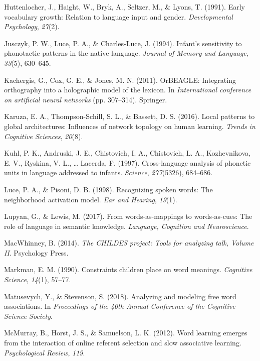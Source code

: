 \documentclass[english,floatsintext,man]{apa6}
\theoremstyle{definition}
\theoremstyle{definition}
\theoremstyle{definition}
\theoremstyle{remark}
\begin{document}
\hypertarget{ref-huttenlocher1991}{}
Huttenlocher, J., Haight, W., Bryk, A., Seltzer, M., \& Lyons, T.
(1991). Early vocabulary growth: Relation to language input and gender.
\emph{Developmental Psychology}, \emph{27}(2).

\hypertarget{ref-jusczyk1994}{}
Jusczyk, P. W., Luce, P. A., \& Charles-Luce, J. (1994). Infant's
sensitivity to phonotactic patterns in the native language.
\emph{Journal of Memory and Language}, \emph{33}(5), 630--645.

\hypertarget{ref-kachergis2011}{}
Kachergis, G., Cox, G. E., \& Jones, M. N. (2011). OrBEAGLE: Integrating
orthography into a holographic model of the lexicon. In
\emph{International conference on artificial neural networks} (pp.
307--314). Springer.

\hypertarget{ref-karuza2016}{}
Karuza, E. A., Thompson-Schill, S. L., \& Bassett, D. S. (2016). Local
patterns to global architectures: Influences of network topology on
human learning. \emph{Trends in Cognitive Sciences}, \emph{20}(8).

\hypertarget{ref-kuhl1997}{}
Kuhl, P. K., Andruski, J. E., Chistovich, I. A., Chistovich, L. A.,
Kozhevnikova, E. V., Ryskina, V. L., \ldots{} Lacerda, F. (1997).
Cross-language analysis of phonetic units in language addressed to
infants. \emph{Science}, \emph{277}(5326), 684--686.

\hypertarget{ref-luce1998}{}
Luce, P. A., \& Pisoni, D. B. (1998). Recognizing spoken words: The
neighborhood activation model. \emph{Ear and Hearing}, \emph{19}(1).

\hypertarget{ref-lupyan2017}{}
Lupyan, G., \& Lewis, M. (2017). From words-as-mappings to
words-as-cues: The role of language in semantic knowledge.
\emph{Language, Cognition and Neuroscience}.

\hypertarget{ref-macwhinney2014}{}
MacWhinney, B. (2014). \emph{The CHILDES project: Tools for analyzing
talk, Volume II}. Psychology Press.

\hypertarget{ref-markman90}{}
Markman, E. M. (1990). Constraints children place on word meanings.
\emph{Cognitive Science}, \emph{14}(1), 57--77.

\hypertarget{ref-matusevych2018}{}
Matusevych, Y., \& Stevenson, S. (2018). Analyzing and modeling free
word associations. In \emph{Proceedings of the 40th Annual Conference of
the Cognitive Science Society}.

\hypertarget{ref-mcmurray2012}{}
McMurray, B., Horst, J. S., \& Samuelson, L. K. (2012). Word learning
emerges from the interaction of online referent selection and slow
associative learning. \emph{Psychological Review}, \emph{119}.
\end{document}
